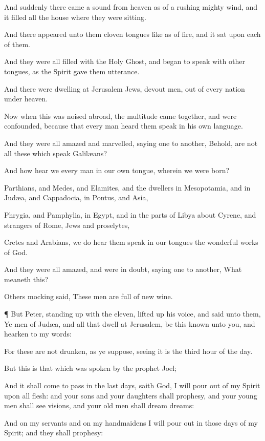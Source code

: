 {And
suddenly there
came a
sound
from
heaven
as of a
rushing
mighty
wind,
and it
filled
all the
house
where they
were
sitting.

And there
appeared unto
them
cloven
tongues like
as of
fire,
and it
sat
upon
each of
them.

And they
were
all
filled with
the
Holy
Ghost,
and
began to speak
with
other
tongues,
as the
Spirit
gave
them
utterance.

And there
were
dwelling
at
Jerusalem
Jews,
devout
men, out
of
every
nation
under
heaven.

Now
when
this
was noised
abroad, the
multitude came
together,
and were
confounded, because
that every
man
heard
them
speak in his
own
language.

And they
were
all
amazed
and
marvelled,
saying
one
to
another,
Behold,
are
not
all
these which
speak
Galilæans?

And
how
hear
we every
man
in
our
own
tongue,
wherein we were
born?

Parthians,
and
Medes,
and
Elamites,
and the
dwellers in
Mesopotamia,
and in
Judæa,
and
Cappadocia, in
Pontus,
and
Asia,

Phrygia,
and
Pamphylia, in
Egypt,
and in the
parts of
Libya
about
Cyrene,
and
strangers of
Rome,
Jews
and
proselytes,

Cretes
and
Arabians, we do
hear
them
speak in
our
tongues the wonderful
works of
God.

And they
were
all
amazed,
and were in
doubt,
saying
one
to
another,
What
meaneth
this?

Others
mocking
said, These
men
are
full of new
wine.


\par }{\PP {}¶
But
Peter, standing
up
with the
eleven, lifted
up
his
voice,
and
said unto
them, Ye
men of
Judæa,
and
all
{} that
dwell at
Jerusalem,
be
this
known unto
you,
and hearken
to
my
words:

For
these
are
not
drunken,
as
ye
suppose, seeing it
is
{}
the
third
hour of the
day.

But
this
is
that which was
spoken
by the
prophet
Joel;

And it shall come to
pass
in the
last
days,
saith
God, I will pour
out
of
my
Spirit
upon
all
flesh:
and
your
sons
and
your
daughters shall
prophesy,
and
your young
men shall
see
visions,
and
your old
men shall
dream
dreams:

And
on
my
servants
and
on
my
handmaidens I will pour
out
in
those
days
of
my
Spirit;
and they shall
prophesy:

}
